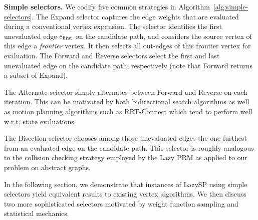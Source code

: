 \documentclass[nobib]{tufte-book}
\newcommand{\ms}[1]{\mbox{\scriptsize #1}}
\begin{document}
\textbf{Simple selectors.}
We codify five common strategies in
Algorithm~\ref{alg:simple-selectors}.
The Expand selector captures the edge weights that are evaluated
during a conventional vertex expansion.
The selector identifies the first unevaluated edge
$e_{\ms{first}}$ on the candidate path,
and considers the source vertex of this edge a \emph{frontier} vertex.
It then selects all out-edges of this frontier vertex
for evaluation.
The Forward and Reverse selectors select the first and last
unevaluated edge on the candidate path, respectively
(note that Forward returns a subset of Expand).

The Alternate selector simply alternates between Forward
and Reverse on each iteration.
This can be motivated by both bidirectional search algorithms
as well as motion planning algorithms such as
RRT-Connect \citep{kuffner2000rrtconnect}
which tend to perform well w.r.t. state evaluations.

The Bisection selector
chooses among those unevaluated edges
the one furthest from an evaluated edge on the candidate path.
This selector is roughly analogous to the collision checking strategy
employed by the Lazy PRM \citep{bohlin2000lazyprm}
as applied to our problem on abstract graphs.

In the following section,
we demonstrate that instances of LazySP using simple selectors
yield equivalent results to existing vertex algorithms.
We then discuss two more sophisticated
selectors motivated by weight function sampling
and statistical mechanics.
\end{document}
